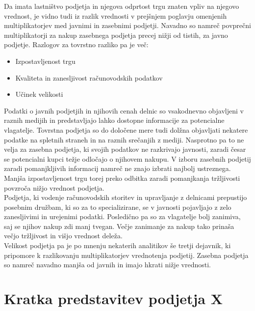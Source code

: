 \documentclass[12pt,a4paper]{amsart}
\theoremstyle{definition} %
\theoremstyle{plain} %
\begin{document}
Da imata lastništvo podjetja in njegova odprtost trgu znaten vpliv na njegovo vrednost, je vidno tudi iz razlik vrednosti v prejšnjem poglavju omenjenih multiplikatorjev med javnimi in zasebnimi podjetji. Navadno so namreč povprečni multiplikatorji za nakup zasebnega podjetja precej nižji od tistih, za javno podjetje. Razlogov za tovrstno razliko pa je več:
\begin{itemize}
\item Izpostavljenost trgu
\item Kvaliteta in zanesljivost računovodskih podatkov 
\item Učinek velikosti
\end{itemize}
Podatki o javnih podjetjih in njihovih cenah delnic so vsakodnevno objavljeni v raznih medijih in predstavljajo lahko dostopne informacije za potencialne vlagatelje. Tovrstna podjetja so do določene mere tudi dolžna objavljati nekatere podatke na spletnih straneh in na raznih srečanjih z mediji. Nasprotno pa to ne velja za zasebna podjetja, ki svojih podatkov ne razkrivajo javnosti, zaradi česar se potencialni kupci težje odločajo o njihovem nakupu. V izboru zasebnih podjetij zaradi pomanjkljivih informacij namreč ne znajo izbrati najbolj ustreznega. Manjša izpostavljenost trgu torej preko odbitka zaradi pomanjkanja tržljivosti povzroča nižjo vrednost podjetja.\\
Podjetja, ki vodenje računovodskih storitev in upravljanje z delnicami prepustijo posebnim družbam, ki so za to specializirane, se v javnosti pojavljajo z zelo zanesljivimi in urejenimi podatki. Posledično pa so za vlagatelje bolj zanimiva, saj se njihov nakup zdi manj tvegan. Večje zanimanje za nakup tako prinaša večjo tržljivost in višjo vrednost deleža.\\
Velikost podjetja pa je po mnenju nekaterih analitikov še tretji dejavnik, ki pripomore k razlikovanju multiplikatorjev vrednotenja podjetij. Zasebna podjetja so namreč navadno manjša od javnih in imajo hkrati nižje vrednosti. \\













\section{Kratka predstavitev podjetja X}
\end{document}
